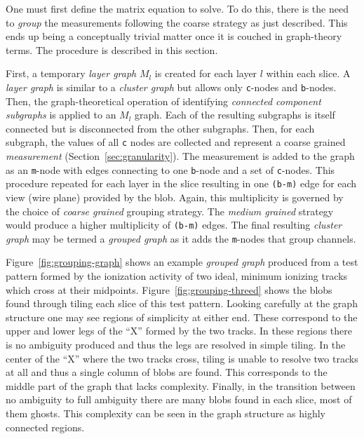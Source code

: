 \documentclass[11pt]{article}
\begin{document}
One must first define the matrix equation to solve. 
To do this, there is the need to \textit{group} the measurements following the coarse strategy as just described. 
This ends up being a conceptually trivial matter once it is couched in graph-theory terms. 
The procedure is described in this section.


First, a temporary \textit{layer graph} $M_l$ is created for each layer $l$ within each slice.  
A \textit{layer graph} is similar to a \textit{cluster graph} but allows only \texttt{c}-nodes and \texttt{b}-nodes. 
Then, the graph-theoretical operation of identifying \emph{connected component subgraphs} is applied to an $M_l$ graph. 
Each of the resulting subgraphs is itself connected but is disconnected from the other subgraphs. 
Then, for each subgraph, the values of all \texttt{c} nodes are collected and represent a coarse grained \textit{measurement} (Section~\ref{sec:granularity}). 
The measurement is added to the graph as an \texttt{m}-node with edges connecting to one \texttt{b}-node and a set of \texttt{c}-nodes.
This procedure repeated for each layer in the slice resulting in one \texttt{(b-m)} edge for each view (wire plane) provided by the blob. 
Again, this multiplicity is governed by the choice of \textit{coarse grained} grouping strategy. 
The \textit{medium grained} strategy would produce a higher multiplicity of \texttt{(b-m)} edges.
The final resulting \textit{cluster graph} may be termed a \textit{grouped graph} as it adds the \texttt{m}-nodes that group channels.

Figure~\ref{fig:grouping-graph} shows an example \textit{grouped graph} produced from a test pattern formed by the ionization activity of two ideal, minimum ionizing tracks which cross at their midpoints.  Figure~\ref{fig:grouping-threed} shows the blobs found through tiling each slice of this test pattern.  Looking carefully at the graph structure one may see regions of simplicity at either end.  These correspond to the upper and lower legs of the ``X'' formed by the two tracks.  In these regions there is no ambiguity produced and thus the legs are resolved in simple tiling.  In the center of the ``X'' where the two tracks cross, tiling is unable to resolve two tracks at all and thus a single column of blobs are found.  This corresponds to the middle part of the graph that lacks complexity.  Finally, in the transition between no ambiguity to full ambiguity there are many blobs found in each slice, most of them ghosts.  This complexity can be seen in the graph structure as highly connected regions.
\end{document}
